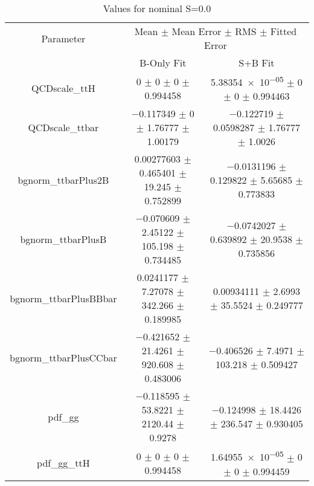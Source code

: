 \begin{table}
\centering
\caption{Values for nominal S=0.0}
\begin{tabular}{ccc}
\toprule
Parameter & \multicolumn{2}{c}{Mean $\pm$ Mean Error $\pm$ RMS $\pm$ Fitted Error}\\
 & B-Only Fit & S+B Fit\\
\midrule
QCDscale\_ttH & \num{0} $\pm$ \num{0} $\pm$ \num{0} $\pm$ \num{0.994458} & \num{5.38354e-05} $\pm$ \num{0} $\pm$ \num{0} $\pm$ \num{0.994463}\\
QCDscale\_ttbar & \num{-0.117349} $\pm$ \num{0} $\pm$ \num{1.76777} $\pm$ \num{1.00179} & \num{-0.122719} $\pm$ \num{0.0598287} $\pm$ \num{1.76777} $\pm$ \num{1.0026}\\
bgnorm\_ttbarPlus2B & \num{0.00277603} $\pm$ \num{0.465401} $\pm$ \num{19.245} $\pm$ \num{0.752899} & \num{-0.0131196} $\pm$ \num{0.129822} $\pm$ \num{5.65685} $\pm$ \num{0.773833}\\
bgnorm\_ttbarPlusB & \num{-0.070609} $\pm$ \num{2.45122} $\pm$ \num{105.198} $\pm$ \num{0.734485} & \num{-0.0742027} $\pm$ \num{0.639892} $\pm$ \num{20.9538} $\pm$ \num{0.735856}\\
bgnorm\_ttbarPlusBBbar & \num{0.0241177} $\pm$ \num{7.27078} $\pm$ \num{342.266} $\pm$ \num{0.189985} & \num{0.00934111} $\pm$ \num{2.6993} $\pm$ \num{35.5524} $\pm$ \num{0.249777}\\
bgnorm\_ttbarPlusCCbar & \num{-0.421652} $\pm$ \num{21.4261} $\pm$ \num{920.608} $\pm$ \num{0.483006} & \num{-0.406526} $\pm$ \num{7.4971} $\pm$ \num{103.218} $\pm$ \num{0.509427}\\
pdf\_gg & \num{-0.118595} $\pm$ \num{53.8221} $\pm$ \num{2120.44} $\pm$ \num{0.9278} & \num{-0.124998} $\pm$ \num{18.4426} $\pm$ \num{236.547} $\pm$ \num{0.930405}\\
pdf\_gg\_ttH & \num{0} $\pm$ \num{0} $\pm$ \num{0} $\pm$ \num{0.994458} & \num{1.64955e-05} $\pm$ \num{0} $\pm$ \num{0} $\pm$ \num{0.994459}\\
\bottomrule
\end{tabular}
\end{table}